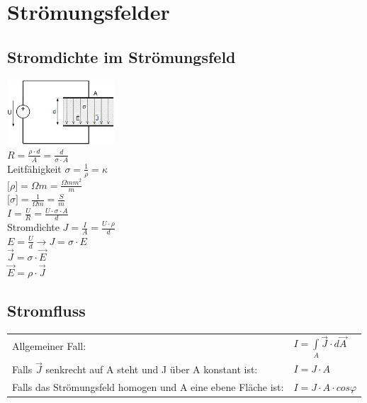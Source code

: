 \section{Strömungsfelder}
\subsection{Stromdichte im Strömungsfeld}
\begin{multicols}{2}
\includegraphics[width=0.3\textwidth]{pics/stroemungsfeld/platten}\\
$ R = \frac{\rho \cdot d}{A} = \frac{d}{\sigma \cdot A}$\\
Leitfähigkeit $ \sigma = \frac{1}{\rho} = \kappa $\\
$ \lbrack \rho \rbrack = \Omega m = \frac{\Omega mm^2}{m} $\\
$ \lbrack \sigma \rbrack = \frac{1}{\Omega m} = \frac{S}{m} $\\
$ I = \frac{U}{R} = \frac{U \cdot \sigma \cdot A}{d} $\\
Stromdichte $ J = \frac{I}{A} = \frac{U \cdot \rho}{d} $\\
$ E = \frac{U}{d} \rightarrow J = \sigma \cdot E $\\
$ \vec J = \sigma \cdot \vec E $ \\
$ \vec E = \rho \cdot \vec J $ \\
\end{multicols}

\subsection{Stromfluss}
\begin{tabular}{ll}
Allgemeiner Fall: & $ I = \int\limits_{A} \vec J \cdot d\vec A $ \\
Falls $ \vec J $ senkrecht auf A steht und J über A konstant ist: & $I = J \cdot A$ \\
Falls das Strömungsfeld homogen und A eine ebene Fläche ist: & $ I = J \cdot A \cdot cos \varphi $
\end{tabular}

